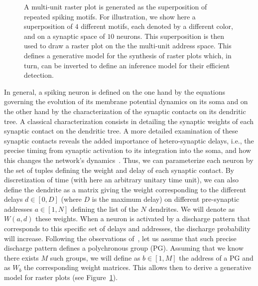 \documentclass[11pt]{article}
\begin{document}
\begin{figure}
%
%
\hfill
{}%
{
\caption{A multi-unit raster plot is generated as the superposition of repeated spiking motifs. For illustration, we show here a superposition of $4$ different motifs, each denoted by a different color, and on a synaptic space of $10$ neurons. This superposition is then used to draw a raster plot on the the multi-unit address space. This defines a generative model for the synthesis of raster plots which, in turn, can be inverted to define an inference model for their efficient detection.
}
\label{fig:1}
}
\vspace{-5pt}
\end{figure}
%
%
In general, a spiking neuron is defined on the one hand by the equations governing the evolution of its membrane potential dynamics on its soma and on the other hand by the characterization of the synaptic contacts on its dendritic tree. A classical characterization consists in detailing the synaptic weights of each synaptic contact on the dendritic tree. A more detailed examination of these synaptic contacts reveals the added importance of hetero-synaptic delays, i.e., the precise timing from synaptic activation to its integration into the soma, and how this changes the network's dynamics~\citep{Izhikevich06}. Thus, we can parameterize each neuron by the set of tuples defining the weight and delay of each synaptic contact. By discretization of time (with here an arbitrary unitary time unit), we can also define the dendrite as a matrix giving the weight corresponding to the different delays $d \in [0, D]$ (where $D$ is the maximum delay) on different pre-synaptic addresses $a \in [1, N]$ defining the list of the $N$ dendrites. We will denote as $W(a, d)$ these weights. When a neuron is activated by a discharge pattern that corresponds to this specific set of delays and addresses, the discharge probability will increase. Following the observations of~\citet{Izhikevich06}, let us assume that such precise discharge pattern defines a polychronous group (PG). Assuming that we know there exists $M$ such groups, we will define as $b \in [1, M]$ the address of a PG and as $W_b$ the corresponding weight matrices. This allows then to derive a generative model for raster plots (see Figure~\ref{fig:1}).
\end{document}
